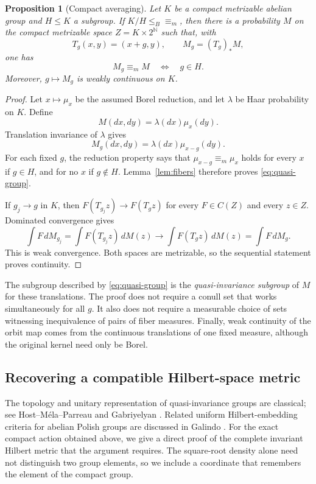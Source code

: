 \documentclass[11pt]{article}
\numberwithin{equation}{section}
\newtheorem{proposition}[theorem]{Proposition}
\theoremstyle{definition}
\newcommand{\N}{\mathbb N}
\newcommand{\ME}{\mathrel{\equiv_m}}
\newcommand{\leB}{\mathrel{\leq_B}}
\begin{document}
\begin{proposition}[Compact averaging]\label{prop:averaging}
Let $K$ be a compact metrizable abelian group and $H\leq K$ a subgroup.
If $K/H\leB\ME$, then there is a
probability $M$ on the compact metrizable space $Z=K\times2^\N$ such
that, with
\[
 T_g(x,y)=(x+g,y),\qquad M_g=(T_g)_*M,
\]
one has
\begin{equation}\label{eq:quasi-group}
 M_g\ME M\quad\Longleftrightarrow\quad g\in H.
\end{equation}
Moreover, $g\mapsto M_g$ is weakly continuous on $K$.
\end{proposition}
\begin{proof}
Let $x\mapsto\mu_x$ be the assumed Borel reduction, and let $\lambda$
be Haar probability on $K$. Define
\[
 M(dx,dy)=\lambda(dx)\mu_x(dy).
\]
Translation invariance of $\lambda$ gives
\[
 M_g(dx,dy)=\lambda(dx)\mu_{x-g}(dy).
\]
For each fixed $g$, the reduction property says that
$\mu_{x-g}\ME\mu_x$ holds for every $x$ if $g\in H$, and for no $x$
if $g\notin H$. Lemma~\ref{lem:fibers} therefore proves
\eqref{eq:quasi-group}.

If $g_j\to g$ in $K$, then $F(T_{g_j}z)\to F(T_gz)$ for every
$F\in C(Z)$ and every $z\in Z$. Dominated convergence gives
\[
 \int F\,dM_{g_j}=\int F(T_{g_j}z)\,dM(z)
 \longrightarrow\int F(T_gz)\,dM(z)=\int F\,dM_g.
\]
This is weak convergence. Both spaces are metrizable, so the sequential
statement proves continuity.
\end{proof}

The subgroup described by \eqref{eq:quasi-group} is the
\emph{quasi-invariance subgroup} of $M$ for these translations. The
proof does not require a conull set that works simultaneously for all
$g$. It also does not require a measurable choice of sets witnessing
inequivalence of pairs of fiber measures. Finally, weak continuity of
the orbit map comes from the continuous translations of one fixed
measure, although the original kernel need only be Borel.
\subsection{Recovering a compatible Hilbert-space metric}
The topology and unitary representation of quasi-invariance groups
are classical; see Host--M\'ela--Parreau \cite[Sections~5.1 and~5.3]{HMP}
and Gabriyelyan \cite[Theorems~2.1 and~2.2]{Gabri06}.
Related uniform Hilbert-embedding criteria for abelian Polish groups
are discussed in Galindo \cite[Theorems~2.2 and~2.3]{Galindo}.
For the exact compact action obtained above, we give a direct proof
of the complete invariant Hilbert metric that the argument requires. The square-root
density alone need not distinguish two group elements, so we include a
coordinate that remembers the element of the compact group.
\end{document}
